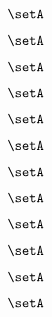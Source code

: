 \begin{forslides}
    \begin{equation}
        \label{eq:slides-translation-113}
        \setA
    \end{equation}

    \begin{equation}
        \label{eq:slides-translation-114}
        \setA
    \end{equation}

    \begin{equation}
        \label{eq:slides-translation-115}
        \setA
    \end{equation}

    \begin{equation}
        \label{eq:slides-translation-116}
        \setA
    \end{equation}

    \begin{equation}
        \label{eq:slides-translation-117}
        \setA
    \end{equation}

    \begin{equation}
        \label{eq:slides-translation-118}
        \setA
    \end{equation}

    \begin{equation}
        \label{eq:slides-translation-119}
        \setA
    \end{equation}
    
    \begin{equation}
        \label{eq:slides-translation-120}
        \setA
    \end{equation}

    \begin{equation}
        \label{eq:slides-translation-121}
        \setA
    \end{equation}

    \begin{equation}
        \label{eq:slides-translation-122}
        \setA
    \end{equation}

    \begin{equation}
        \label{eq:slides-translation-123}
        \setA
    \end{equation}

    \begin{equation}
        \label{eq:slides-translation-124}
        \setA
    \end{equation}


\end{forslides}
